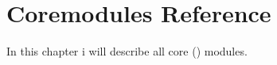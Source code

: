 \newcommand{\CoreModDesc}[1]{\subsection{#1}\indexii{Core Module}{#1}}
\newcommand{\CoreMod}[1]{\code{#1}}

\chapter{Coremodules Reference}
In this chapter i will describe all core () modules.
